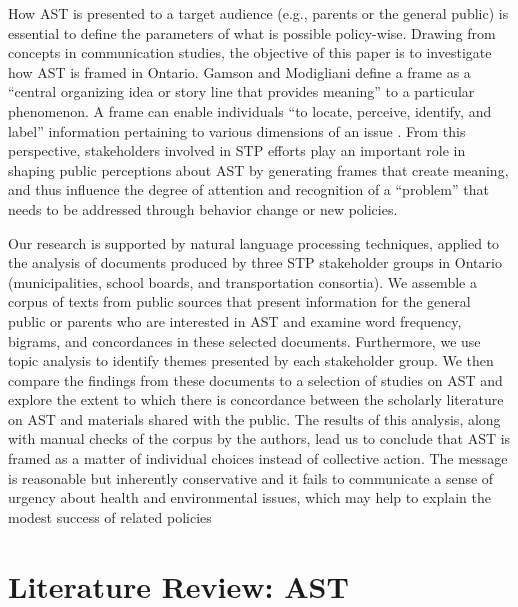 \documentclass[preprint, 3p,
authoryear]{elsarticle} %
\begin{document}
How AST is presented to a target audience (e.g., parents or the general
public) is essential to define the parameters of what is possible
policy-wise. Drawing from concepts in communication studies, the
objective of this paper is to investigate how AST is framed in Ontario.
Gamson and Modigliani \citeyearpar{gamsonChangingCulture1987} define a
frame as a ``central organizing idea or story line that provides
meaning'' to a particular phenomenon. A frame can enable individuals
``to locate, perceive, identify, and label'' information pertaining to
various dimensions of an issue \citep{goffmanFrameAnalysisEssay1974}.
From this perspective, stakeholders involved in STP efforts play an
important role in shaping public perceptions about AST by generating
frames that create meaning, and thus influence the degree of attention
and recognition of a ``problem'' that needs to be addressed through
behavior change or new policies.

Our research is supported by natural language processing techniques,
applied to the analysis of documents produced by three STP stakeholder
groups in Ontario (municipalities, school boards, and transportation
consortia). We assemble a corpus of texts from public sources that
present information for the general public or parents who are interested
in AST and examine word frequency, bigrams, and concordances in these
selected documents. Furthermore, we use topic analysis to identify
themes presented by each stakeholder group. We then compare the findings
from these documents to a selection of studies on AST and explore the
extent to which there is concordance between the scholarly literature on
AST and materials shared with the public. The results of this analysis,
along with manual checks of the corpus by the authors, lead us to
conclude that AST is framed as a matter of individual choices instead of
collective action. The message is reasonable but inherently conservative
and it fails to communicate a sense of urgency about health and
environmental issues, which may help to explain the modest success of
related policies
\citep{buliungSchoolTravelPlanning2011, mammenSchoolTravelPlanning2014, mammenActiveSchoolTravel2014}

\hypertarget{literature-review-ast}{%
\section{Literature Review: AST}\label{literature-review-ast}}
\end{document}
